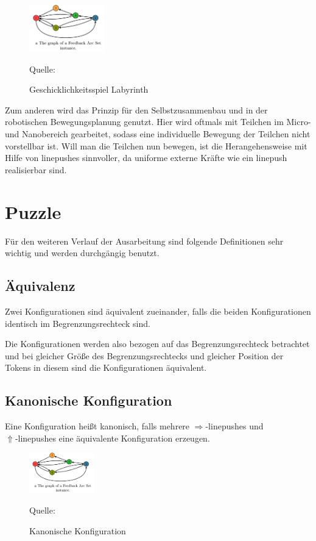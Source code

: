 \documentclass[seminar,german]{algothesis}
\newcommand*{\quelle}{%
  \footnotesize Quelle:
}
\begin{document}
\begin{figure}[ht]
	\centering
	\includegraphics[width=0.29\textwidth]{graph}
	\caption{Geschicklichkeitsspiel Labyrinth}
	\quelle\cite{labyrinth}
	\label{fig:lab}
\end{figure}
\newpage
\noindent
Zum anderen wird das Prinzip für den Selbstzusammenbau und in der robotischen Bewegungsplanung genutzt. Hier wird oftmals mit Teilchen im Micro- und Nanobereich gearbeitet, sodass eine individuelle Bewegung der Teilchen nicht vorstellbar ist. Will man die Teilchen nun bewegen, ist die Herangehensweise mit Hilfe von linepushes sinnvoller, da uniforme externe Kräfte wie ein linepush realisierbar sind.


\section{Puzzle}
Für den weiteren Verlauf der Ausarbeitung sind folgende Definitionen sehr wichtig und werden durchgängig benutzt.

\subsection{Äquivalenz}
\begin{definition}
Zwei Konfigurationen sind äquivalent zueinander, falls die beiden Konfigurationen identisch im Begrenzungsrechteck sind. 
\end{definition}
\noindent Die Konfigurationen werden also bezogen auf das Begrenzungsrechteck betrachtet und bei gleicher Größe des Begrenzungsrechtecks und gleicher Position der Tokens in diesem sind die Konfigurationen äquivalent.


\subsection{Kanonische Konfiguration}
\begin{definition}
Eine Konfiguration heißt kanonisch, falls mehrere $\Rightarrow$-linepushes und \\$\Uparrow$-linepushes eine äquivalente Konfiguration erzeugen.
\end{definition}

\begin{figure}[ht]
	\centering
	\includegraphics[width=0.25\textwidth]{graph}
	\caption{Kanonische Konfiguration}
	\quelle \cite{akitaya2022pushing}
	\label{fig:3}
\end{figure}
\end{document}
